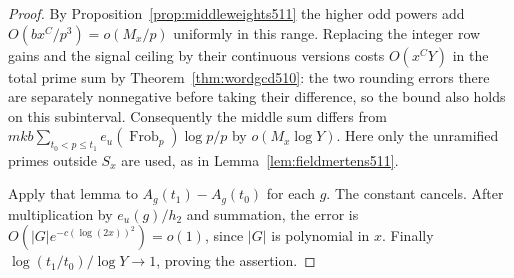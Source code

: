 \documentclass[a4paper,11pt]{article}
\theoremstyle{definition}
\theoremstyle{remark}
\numberwithin{equation}{section}
\begin{document}
\begin{proof}
By Proposition~\ref{prop:middleweights511} the higher odd
powers add \(O(bx^C/p^3)=o(M_x/p)\) uniformly in this range.
Replacing the integer row gains and the signal ceiling by their
continuous versions costs \(O(x^C Y)\) in the total prime sum
by Theorem~\ref{thm:wordgcd510}: the two rounding errors there
are separately nonnegative before taking their difference, so
the bound also holds on this subinterval. Consequently the
middle sum differs from \(mkb\sum_{t_0<p\le t_1}
e_u(\operatorname{Frob}_p)\log p/p\) by \(o(M_x\log Y)\).
Here only the unramified primes outside \(S_x\) are used, as
in Lemma~\ref{lem:fieldmertens511}.

Apply that lemma to \(A_g(t_1)-A_g(t_0)\) for each \(g\).
The constant cancels. After multiplication by \(e_u(g)/h_2\)
and summation, the error is
\(O(|G|e^{-c(\log(2x))^2})=o(1)\), since \(|G|\) is polynomial
in \(x\). Finally \(\log(t_1/t_0)/\log Y\to1\), proving
the assertion.
\end{proof}
\end{document}
